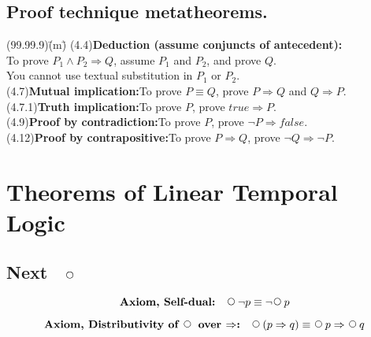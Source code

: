 \documentclass[12pt, fleqn, leqno]{article}
\newcommand{\lgap}{2pt}                             %
\newcommand{\impl}{\ensuremath{\Rightarrow}}        %
\newcommand{\Next}{\;\,\text{\raisebox{3.5pt}{\circle{6}}}}
\newcommand{\spacer}{\vspace{-30pt}}
\newcommand{\firstspacer}{\vspace{-26pt}}
\begin{document}
\subsection*{Proof technique metatheorems.}
\begin{tabbing}
(99.99.9)\;\=(m)\;\=\kill
(4.4)\>\textbf{Deduction (assume conjuncts of antecedent):}\\[\lgap]
      \>To prove $P_{1}\land P_{2}\impl Q$, assume $P_{1}$ and $P_{2}$, and prove $Q$.\\[\lgap]
      \>You cannot use textual substitution in $P_{1}$ or $P_{2}$.\\[\lgap]
(4.7)\>\textbf{Mutual implication:}\quad To prove $P\equiv Q$, prove $P\impl Q$ and $Q\impl P$.\\[\lgap]
(4.7.1)\>\textbf{Truth implication:}\quad To prove $P$, prove $true\impl P$.\\[\lgap]
(4.9)\>\textbf{Proof by contradiction:}\quad To prove $P$, prove $\neg P\impl false$.\\[\lgap]
(4.12)\>\textbf{Proof by contrapositive:}\quad To prove $P\impl Q$, prove $\neg Q\impl \neg P$.\\
\end{tabbing}

\section*{Theorems of Linear Temporal Logic}

\subsection*{Next $\quad\Next$}

\begin{equation}\label{E:selfDual}
\textbf{Axiom, Self-dual:}\quad \Next\neg p \equiv \neg\Next p
\end{equation}

\firstspacer

\begin{equation}\label{E:distNextImp}
\textbf{Axiom, Distributivity of $\Next$ over $\impl$:}\quad \Next (p \impl q) \equiv \Next p \impl \Next q
\end{equation}

\spacer
\end{document}
